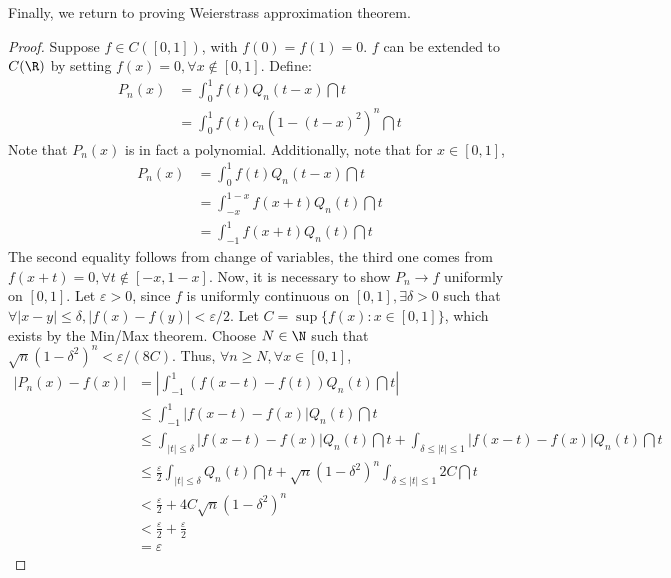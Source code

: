 \vspace{1em}
Finally, we return to proving Weierstrass approximation theorem.
\begin{proof}
    Suppose $f \in C([0, 1])$, with $f(0) = f(1) = 0$. $f$ can be extended to $C(\R)$ by setting $f(x) = 0, \forall x \not \in [0,1]$. Define:
    \begin{align*}
        P_n(x) &= \int_0^1 f(t) Q_n(t - x) \dint t \\
        &= \int_0^1 f(t) c_n (1 - (t - x)^2)^n \dint t
    \end{align*}
    Note that $P_n(x)$ is in fact a polynomial. Additionally, note that for $x \in [0,1]$,
    \begin{align*}
        P_n(x) &= \int_0^1 f(t) Q_n(t - x) \dint t \\
        &= \int_{-x}^{1 - x} f(x + t)Q_n(t) \dint t \\
        &= \int_{-1}^1 f(x + t)Q_n(t)\dint t
    \end{align*}
    The second equality follows from change of variables, the third one comes from $f(x + t) = 0, \forall t \not \in [-x, 1 - x]$.
    Now, it is necessary to show $P_n \to f$ uniformly on $[0,1]$. Let $\varepsilon > 0$, since $f$ is uniformly continuous on $[0,1], \exists \delta > 0$ such that $\forall |x-y| \leq \delta, |f(x) - f(y)| < \varepsilon/2$. Let $C = \sup \{f(x):x \in [0,1]\}$, which exists by the Min/Max theorem. Choose $N \in \N$ such that $\sqrt{n}(1 - \delta^2)^n < \varepsilon/(8C)$. Thus, $\forall n \geq N, \forall x \in [0,1]$,
    \begin{align*}
        |P_n(x) - f(x)| &= \left |
            \int_{-1}^1 (f(x-t) - f(t))Q_n(t) \dint t
        \right | \\
        & \leq \int_{-1}^1 |f(x - t) - f(x)| Q_n(t) \dint t \\
        & \leq \int_{|t| \leq \delta} |f(x - t) - f(x)| Q_n(t) \dint t + \int_{\delta \leq |t| \leq 1} |f(x - t) - f(x)| Q_n(t) \dint t \\
        & \leq \frac{\varepsilon}{2}\int_{|t| \leq \delta} Q_n(t) \dint t + \sqrt{n}(1 - \delta^2)^n \int_{\delta \leq |t| \leq 1} 2C \dint t \\
        &< \frac{\varepsilon}{2} + 4C \sqrt{n}(1 - \delta^2)^n \\
        &< \frac{\varepsilon}{2} + \frac{\varepsilon}{2} \\
        &= \varepsilon
    \end{align*}
\end{proof}